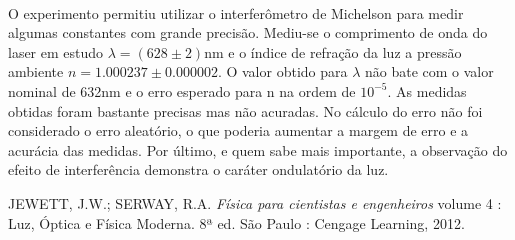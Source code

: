 \documentclass[a4paper,11pt]{article}
\begin{document}
\paragraph{} O experimento permitiu utilizar o interferômetro de Michelson para medir algumas constantes com grande precisão. Mediu-se o comprimento de onda do laser em estudo $\lambda = (628 \pm 2) \mbox{nm}$ e o índice de refração da luz a pressão ambiente $n = 1.000237 \pm 0.000002$. O valor obtido para $\lambda$ não bate com o valor nominal de 632nm e o erro esperado para n na ordem de $10^{-5}$. As medidas obtidas foram bastante precisas mas não acuradas. No cálculo do erro não foi considerado o erro aleatório, o que poderia aumentar a margem de erro e a acurácia das medidas. Por último, e quem sabe mais importante, a observação do efeito de interferência demonstra o caráter ondulatório da luz.
\begin{thebibliography}{9}    
  		JEWETT, J.W.; SERWAY, R.A.
  		\emph{Física para cientistas e engenheiros} volume 4 : Luz, Óptica e Física Moderna.
 		 8ª ed.
 		 São Paulo : Cengage Learning, 2012.
\end{thebibliography}
\end{document}
